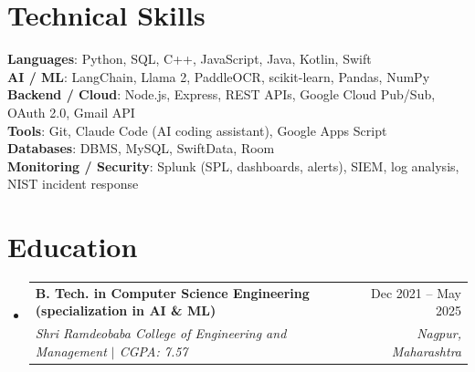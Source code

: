\documentclass[a4paper,11pt]{article}
\makeatletter
\newcommand{\resumeSubheading}[4]{
  \vspace{-1pt}\item
    \begin{tabularx}{0.97\textwidth}[t]{@{}>{\raggedright\arraybackslash}X@{\hspace{0.75em}}r@{}}
      \textbf{#1} & #2 \\
      \textit{\small#3} & \textit{\small #4} \\
    \end{tabularx}\vspace{-3pt}
}
\newcommand{\resumeSubItemListStart}{\begin{itemize}[leftmargin=0.15in, label={}]}
\newcommand{\resumeSubItemListEnd}{\end{itemize}}
\makeatother
\begin{document}
\section{Technical Skills}
  \begin{itemize}[leftmargin=0.15in, label={}]
    \small{\item{
      \textbf{Languages}{: Python, SQL, C++, JavaScript, Java, Kotlin, Swift} \\
      \textbf{AI / ML}{: LangChain, Llama 2, PaddleOCR, scikit-learn, Pandas, NumPy} \\
      \textbf{Backend / Cloud}{: Node.js, Express, REST APIs, Google Cloud Pub/Sub, OAuth 2.0, Gmail API} \\
      \textbf{Tools}{: Git, Claude Code (AI coding assistant), Google Apps Script} \\
      \textbf{Databases}{: DBMS, MySQL, SwiftData, Room} \\
      \textbf{Monitoring / Security}{: Splunk (SPL, dashboards, alerts), SIEM, log analysis, NIST incident response}
    }}
  \end{itemize}

\section{Education}
  \resumeSubItemListStart
    \resumeSubheading
      {B. Tech. in Computer Science Engineering (specialization in AI \& ML)}{Dec 2021 -- May 2025}
      {Shri Ramdeobaba College of Engineering and Management $|$ CGPA: 7.57}{Nagpur, Maharashtra}
  \resumeSubItemListEnd
\end{document}
